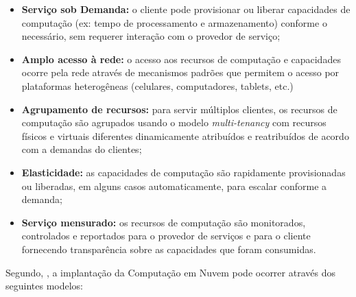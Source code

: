 \begin{itemize}
    
    \item \textbf{Serviço sob Demanda:} o cliente pode provisionar ou liberar
    capacidades de computação (ex: tempo de processamento e armazenamento) conforme o
    necessário, sem requerer interação com o provedor de serviço;
    
    \item \textbf{Amplo acesso à rede:} o acesso aos recursos de computação e
    capacidades ocorre pela rede através de mecanismos padrões que permitem o
    acesso por plataformas heterogêneas (celulares, computadores, tablets, etc.)
      
    \item \textbf{Agrupamento de recursos:} para servir múltiplos clientes, os
    recursos de computação são agrupados usando o modelo \emph{multi-tenancy}
    com recursos físicos e virtuais diferentes dinamicamente atribuídos e
    reatribuídos de acordo com a demandas do clientes;
    
    \item \textbf{Elasticidade:} as capacidades de computação são rapidamente
    provisionadas ou liberadas, em alguns casos automaticamente, para escalar
    conforme a demanda;
    
    \item \textbf{Serviço mensurado:} os recursos de computação são monitorados,
    controlados e reportados para o provedor de serviços e para o cliente
    fornecendo transparência sobre as capacidades que foram consumidas.

\end{itemize}

Segundo, , a implantação da Computação em Nuvem pode
ocorrer através dos seguintes modelos:

